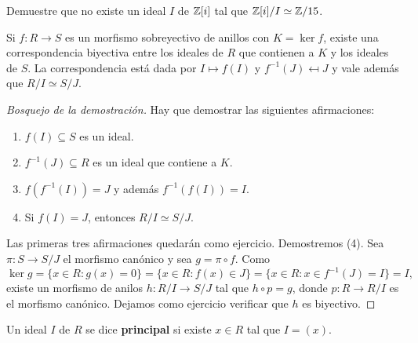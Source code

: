 \begin{exercise}
Demuestre que no existe un ideal $I$ de $\mathbb{Z}[i]$ tal que $\mathbb{Z}[i]/I\simeq\mathbb{Z}/15$.
\end{exercise}



%

\begin{theorem}
Si $f\colon R\to S$ es un morfismo sobreyectivo de anillos con $K=\ker f$, existe una correspondencia biyectiva entre los ideales de $R$ que contienen a $K$ y los ideales de $S$. 
La correspondencia está dada por $I\mapsto f(I)$ y $f^{-1}(J)\mapsfrom J$ y vale además que $R/I\simeq S/J$.  
\end{theorem}

\begin{proof}[Bosquejo de la demostración]
Hay que demostrar las siguientes afirmaciones:
\begin{enumerate}
\item $f(I)\subseteq S$ es un ideal.
\item $f^{-1}(J)\subseteq R$ es un ideal que contiene a $K$.
\item $f(f^{-1}(I))=J$ y además $f^{-1}(f(I))=I$.
\item Si $f(I)=J$, entonces $R/I\simeq S/J$.	
\end{enumerate}
Las primeras tres afirmaciones quedarán como ejercicio. Demostremos (4). Sea $\pi\colon S\to S/J$ el morfismo canónico y sea 
$g=\pi\circ f$. Como
\[
\ker g=\{x\in R:g(x)=0\}=\{x\in R:f(x)\in J\}=\{x\in R:x\in f^{-1}(J)=I\}=I,
\]
existe un morfismo de anilos $h\colon R/I\to S/J$ tal que $h\circ p=g$, donde $p\colon R\to R/I$ es el morfismo canónico. Dejamos como ejercicio verificar que $h$ es biyectivo.
\end{proof}


\begin{definition}
Un ideal $I$ de $R$ se dice \textbf{principal} si existe $x\in R$ tal que $I=(x)$. 
\end{definition}

